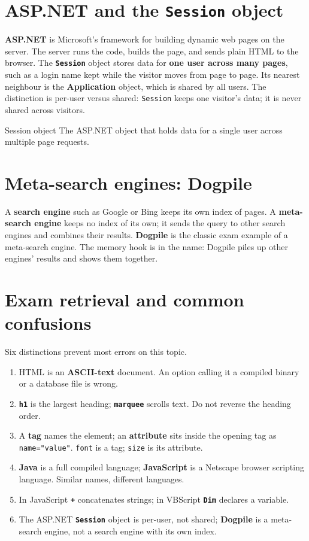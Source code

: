 \section{ASP.NET and the \texttt{Session} object}
\textbf{ASP.NET} is Microsoft's framework for building dynamic web pages on the server. The server runs the code, builds the page, and sends plain HTML to the browser. The \textbf{\texttt{Session}} object stores data for \textbf{one user across many pages}, such as a login name kept while the visitor moves from page to page. Its nearest neighbour is the \textbf{Application} object, which is shared by all users. The distinction is per-user versus shared: \texttt{Session} keeps one visitor's data; it is never shared across visitors.

\begin{definitionbox}{Session object}
The ASP.NET object that holds data for a single user across multiple page requests.
\end{definitionbox}

\section{Meta-search engines: Dogpile}
A \textbf{search engine} such as Google or Bing keeps its own index of pages. A \textbf{meta-search engine} keeps no index of its own; it sends the query to other search engines and combines their results. \textbf{Dogpile} is the classic exam example of a meta-search engine. The memory hook is in the name: Dogpile piles up other engines' results and shows them together.

\section{Exam retrieval and common confusions}
Six distinctions prevent most errors on this topic.
\begin{enumerate}
  \item HTML is an \textbf{ASCII-text} document. An option calling it a compiled binary or a database file is wrong.
  \item \textbf{\texttt{h1}} is the largest heading; \textbf{\texttt{marquee}} scrolls text. Do not reverse the heading order.
  \item A \textbf{tag} names the element; an \textbf{attribute} sits inside the opening tag as \texttt{name="value"}. \texttt{font} is a tag; \texttt{size} is its attribute.
  \item \textbf{Java} is a full compiled language; \textbf{JavaScript} is a Netscape browser scripting language. Similar names, different languages.
  \item In JavaScript \textbf{\texttt{+}} concatenates strings; in VBScript \textbf{\texttt{Dim}} declares a variable.
  \item The ASP.NET \textbf{\texttt{Session}} object is per-user, not shared; \textbf{Dogpile} is a meta-search engine, not a search engine with its own index.
\end{enumerate}

